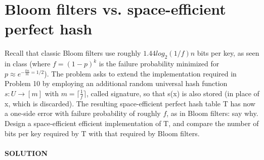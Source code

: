 \documentclass[a4paper]{article}
\newcommand\ceil[1]{\lceil#1\rceil}
\begin{document}
\section*{Bloom filters vs. space-efficient perfect hash}
Recall that classic Bloom filters use roughly $1.44 log_2(1/f)n$ bits per key, as seen in class (where $f = (1 − p)^k$ is the failure probability minimized for $p \approx e^{− \frac{kn}{m}= 1/2}$). The problem asks to extend the implementation required in Problem 10 by employing an additional random universal hash function $s : U \rightarrow [m]$ with $m =\ceil{\frac{1}{f}}$, called signature, so that s(x) is also stored (in
place of x, which is discarded). The resulting space-efficient perfect hash table T has now a one-side error with failure probability of roughly $f$, as in Bloom filters: say why. Design a space-efficient efficient implementation of T, and compare the number of bits per key required by T with that required by Bloom filters.
\\
\\
\textbf{SOLUTION}
\\
\\
\end{document}
